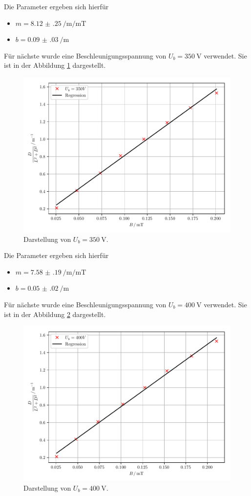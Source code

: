 Die Parameter ergeben sich hierfür
\begin{itemize}
  \item $m = \SI[per-mode=fraction]{8.12(25)}{\per\meter\per\milli\tesla}$
  \item $b =\SI[per-mode=fraction]{0.09(03)}{\per\meter}$
\end{itemize}
Für nächste wurde eine Beschleunigungsspannung von $U_b = \SI{350}{\volt}$ verwendet.
Sie ist in der Abbildung \ref{abb:14} dargestellt.
\begin{figure}[H]
  \centering
  \includegraphics{plot9.pdf}
  \caption{Darstellung von $U_b=\SI{350}{\volt}$.}
  \label{abb:14}
\end{figure}
Die Parameter ergeben sich hierfür
\begin{itemize}
  \item $m = \SI[per-mode=fraction]{7.58(19)}{\per\meter\per\milli\tesla}$
  \item $b =\SI[per-mode=fraction]{0.05(02)}{\per\meter}$
\end{itemize}
Für nächste wurde eine Beschleunigungsspannung von $U_b = \SI{400}{\volt}$ verwendet.
Sie ist in der Abbildung \ref{abb:15} dargestellt.
\begin{figure}[H]
  \centering
  \includegraphics{plot10.pdf}
  \caption{Darstellung von $U_b=\SI{400}{\volt}$.}
  \label{abb:15}
\end{figure}
